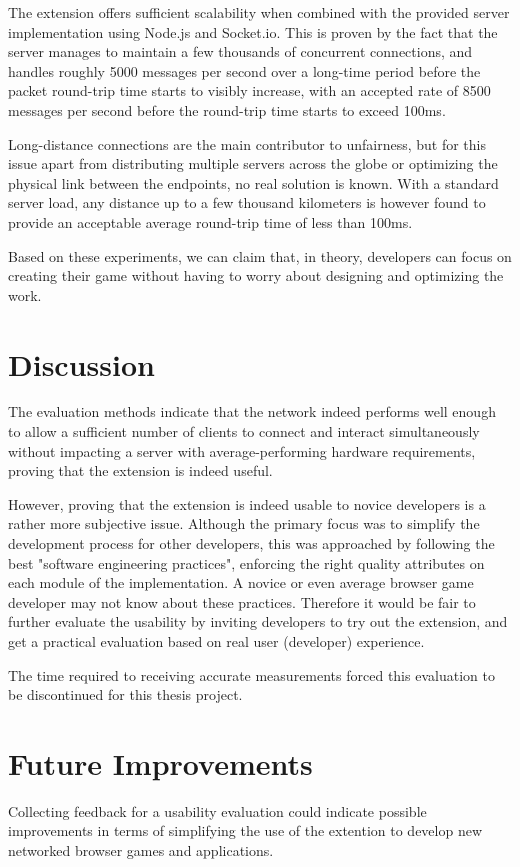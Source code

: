 \documentclass[bsc, 12pt, twoside, singlespacing, parskip, abbrevs, notimes, normalheadings, logo]{styles/infthesis}
\begin{document}
The extension offers sufficient scalability when combined with the provided server implementation using Node.js and Socket.io. This is proven by the fact that the server manages to maintain a few thousands of concurrent connections, and handles roughly 5000 messages per second over a long-time period before the packet round-trip time starts to visibly increase, with an accepted rate of 8500 messages per second before the round-trip time starts to exceed 100ms. 

Long-distance connections are the main contributor to unfairness, but for this issue apart from distributing multiple servers across the globe or optimizing the physical link between the endpoints, no real solution is known. With a standard server load, any distance up to a few thousand kilometers is however found to provide an acceptable average round-trip time of less than 100ms.

Based on these experiments, we can claim that, in theory, developers can focus on creating their game without having to worry about designing and optimizing the work.

\section{Discussion}
The evaluation methods indicate that the network indeed performs well enough to allow a sufficient number of clients to connect and interact simultaneously without impacting a server with average-performing hardware requirements, proving that the extension is indeed useful.

However, proving that the extension is indeed usable to novice developers is a rather more subjective issue. Although the primary focus was to simplify the development process for other developers, this was approached by following the best "software engineering practices", enforcing the right quality attributes on each module of the implementation. A novice or even average browser game developer may not know about these practices. Therefore it would be fair to further evaluate the usability by inviting developers to try out the extension, and get a practical evaluation based on real user (developer) experience.

The time required to receiving accurate measurements forced this evaluation to be discontinued for this thesis project.

\section{Future Improvements}
Collecting feedback for a usability evaluation could indicate possible improvements in terms of simplifying the use of the extention to develop new networked browser games and applications.
\end{document}
